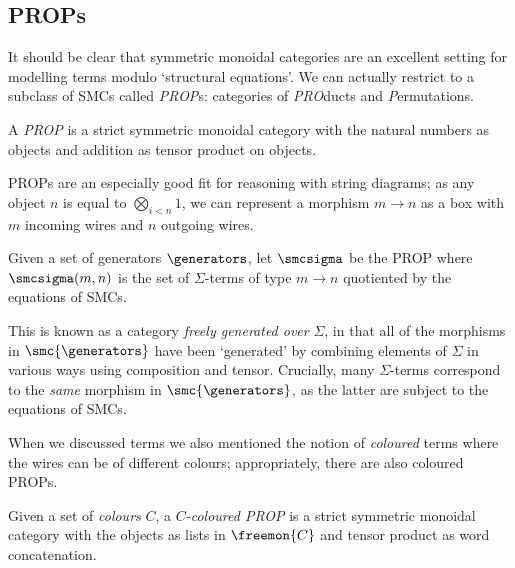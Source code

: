 \subsection{PROPs}

It should be clear that symmetric monoidal categories are an excellent setting
for modelling terms modulo `structural equations'.
We can actually restrict to a subclass of SMCs called \emph{PROP}s: categories
of \emph{PRO}ducts and \emph{P}ermutations.

\begin{definition}\label{def:prop}
    A \emph{PROP} is a strict symmetric monoidal category with the
    natural numbers as objects and addition as tensor product on objects.
\end{definition}

PROPs are an especially good fit for reasoning with string diagrams; as any
object \(n\) is equal to \(\bigotimes_{i < n} 1\), we can represent a morphism
\(m \to n\) as a box with \(m\) incoming wires and \(n\) outgoing wires.

\begin{definition}\label{def:freely-generated-prop}
    Given a set of generators \(\generators\), let \(\smcsigma\) be the
    PROP where \(\smcsigma(m, n)\) is the set of \(\Sigma\)-terms of type
    \(m \to n\) quotiented by the equations of SMCs.
\end{definition}

This is known as a category \emph{freely generated over} \(\Sigma\), in that all
of the morphisms in \(\smc{\generators}\) have been `generated' by combining
elements of \(\Sigma\) in various ways using composition and tensor.
Crucially, many \(\Sigma\)-terms correspond to the \emph{same} morphism in
\(\smc{\generators}\), as the latter are subject to the equations of SMCs.

When we discussed terms we also mentioned the notion of \emph{coloured} terms
where the wires can be of different colours; appropriately, there are also
coloured PROPs.

\begin{definition}
    Given a set of \emph{colours} \(C\), a \emph{\(C\)-coloured PROP} is a strict
    symmetric monoidal category with the objects as lists in \(\freemon{C}\) and
    tensor product as word concatenation.
\end{definition}

